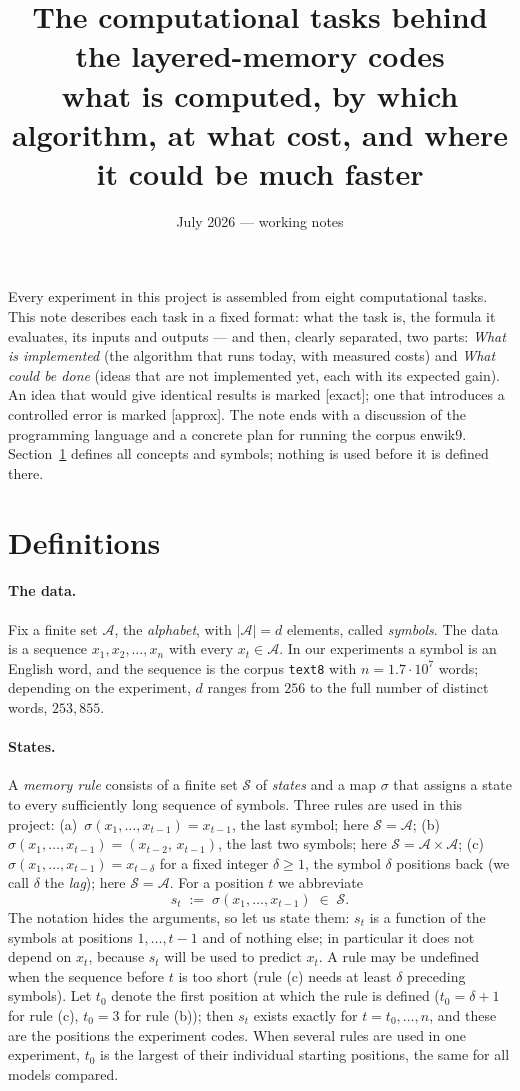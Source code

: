 \documentclass[11pt]{article}
\title{The computational tasks behind the layered-memory codes\\
\large what is computed, by which algorithm, at what cost,
and where it could be much faster}
\author{}
\date{July 2026 --- working notes}
\newcommand{\field}[1]{\paragraph{#1.}}
\begin{document}
\maketitle

\noindent
Every experiment in this project is assembled from eight
computational tasks.  This note describes each task in a fixed
format: what the task is, the formula it evaluates, its inputs and
outputs --- and then, clearly separated, two parts: \emph{What is
implemented} (the algorithm that runs today, with measured costs)
and \emph{What could be done} (ideas that are not implemented yet,
each with its expected gain).  An idea that would give identical
results is marked [exact]; one that introduces a controlled error is
marked [approx].  The note ends with a discussion of the programming
language and a concrete plan for running the corpus enwik9.
Section~\ref{sec:defs} defines all concepts and symbols; nothing is
used before it is defined there.

\section{Definitions}
\label{sec:defs}

\field{The data}
Fix a finite set $\mathcal{A}$, the \emph{alphabet}, with
$|\mathcal{A}| = d$ elements, called \emph{symbols}.  The data is a
sequence $x_1, x_2, \dots, x_n$ with every $x_t \in \mathcal{A}$.
In our experiments a symbol is an English word, and the sequence is
the corpus \texttt{text8} with $n = 1.7 \cdot 10^7$ words;
depending on the experiment, $d$ ranges from $256$ to the full
number of distinct words, $253{,}855$.

\field{States}
A \emph{memory rule} consists of a finite set $\mathcal{S}$ of
\emph{states} and a map $\sigma$ that assigns a state to every
sufficiently long sequence of symbols.  Three rules are used in this
project:
(a)~$\sigma(x_1, \dots, x_{t-1}) = x_{t-1}$, the last symbol; here
$\mathcal{S} = \mathcal{A}$;
(b)~$\sigma(x_1, \dots, x_{t-1}) = (x_{t-2},\, x_{t-1})$, the last
two symbols; here $\mathcal{S} = \mathcal{A} \times \mathcal{A}$;
(c)~$\sigma(x_1, \dots, x_{t-1}) = x_{t-\delta}$ for a fixed
integer $\delta \ge 1$, the symbol $\delta$ positions back (we
call $\delta$ the \emph{lag}); here $\mathcal{S} = \mathcal{A}$.
For a position $t$ we abbreviate
\[
  s_t \;:=\; \sigma(x_1, \dots, x_{t-1}) \;\in\; \mathcal{S}.
\]
The notation hides the arguments, so let us state them: $s_t$ is a
function of the symbols at positions $1, \dots, t-1$ and of nothing
else; in particular it does not depend on $x_t$, because $s_t$ will
be used to predict $x_t$.  A rule may be undefined when the sequence
before $t$ is too short (rule (c) needs at least $\delta$ preceding
symbols).  Let $t_0$ denote the first position at which the rule is
defined ($t_0 = \delta + 1$ for rule (c), $t_0 = 3$ for rule (b));
then $s_t$ exists exactly for $t = t_0, \dots, n$, and these are the
positions the experiment codes.  When several rules are used in one
experiment, $t_0$ is the largest of their individual starting
positions, the same for all models compared.
\end{document}
